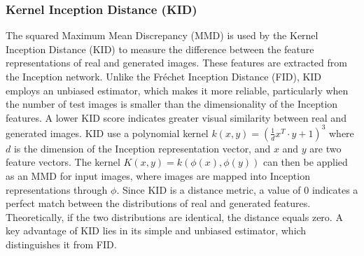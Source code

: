 \documentclass[lettersize,journal]{IEEEtran}
\begin{document}
\subsubsection{Kernel Inception Distance (KID)}
The squared Maximum Mean Discrepancy (MMD) is used by the Kernel Inception Distance (KID) to measure the difference between the feature representations of real and generated images. These features are extracted from the Inception network. Unlike the Fréchet Inception Distance (FID)\cite{heusel2017gans}, KID employs an unbiased estimator, which makes it more reliable, particularly when the number of test images is smaller than the dimensionality of the Inception features. A lower KID score indicates greater visual similarity between real and generated images\cite{kim2019ugatit}.
KID use a polynomial kernel $k(x,y)=(\frac{1}{d}x^T\cdot y+1)^3$ where $d$ is the dimension of the Inception representation vector, and $x$ and $y$ are two feature vectors. The kernel $K(x,y)=k(\phi(x),\phi(y))$ can then be applied as an MMD for input images, where images are mapped into Inception representations through $\phi$\cite{binkowski2018demystifying}.
Since KID is a distance metric, a value of 0 indicates a perfect match between the distributions of real and generated features. Theoretically, if the two distributions are identical, the distance equals zero. A key advantage of KID lies in its simple and unbiased estimator, which distinguishes it from FID\cite{binkowski2018demystifying}.
\end{document}
